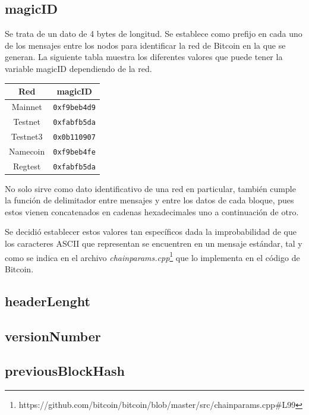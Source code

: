 \documentclass{article}
\begin{document}
    \subsection{magicID}
    Se trata de un dato de 4 bytes de longitud. Se establece como prefijo en cada uno de los mensajes entre los nodos para identificar la red de Bitcoin en la que se generan. La siguiente tabla muestra los diferentes valores que puede tener la variable magicID dependiendo de la red.
    
    \begin{table}[H]
    \centering
    \begin{tabular}{| c | c |} 
        \hline
        Red & magicID \\
        \hline
        Mainnet & \texttt{0xf9beb4d9} \\
        \hline
        Testnet & \texttt{0xfabfb5da} \\
        \hline
        Testnet3 & \texttt{0x0b110907} \\
        \hline
        Namecoin & \texttt{0xf9beb4fe} \\
        \hline
        Regtest & \texttt{0xfabfb5da} \\
        \hline
    \end{tabular}
    \label{table:1}
    \end{table}
    
    No solo sirve como dato identificativo de una red en particular, también cumple la función de delimitador entre mensajes y entre los datos de cada bloque, pues estos vienen concatenados en cadenas hexadecimales uno a continuación de otro.
    
    Se decidió establecer estos valores tan específicos dada la improbabilidad de que los caracteres ASCII que representan se encuentren en un mensaje estándar, tal y como se indica en el archivo \textit{chainparams.cpp}\footnote{https://github.com/bitcoin/bitcoin/blob/master/src/chainparams.cpp\#L99} que lo implementa en el código de Bitcoin.
    
    \subsection{headerLenght}
    \subsection{versionNumber}
    \subsection{previousBlockHash}
\end{document}
